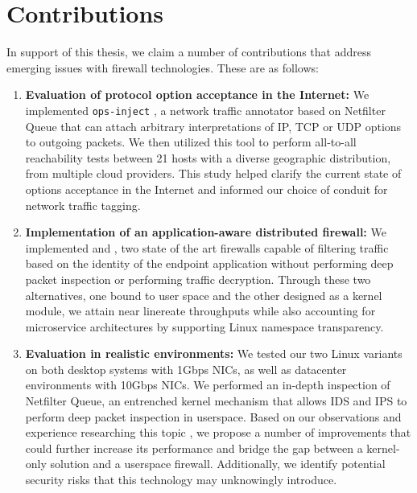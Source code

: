 \section{Contributions}
\label{conclusion:contrib}

In support of this thesis, we claim a number of contributions that address
emerging issues with firewall technologies. These are as follows:

\begin{enumerate}
    \item \textbf{Evaluation of protocol option acceptance in the Internet:}
    We implemented \texttt{ops-inject} \cite{mantu2024framework}, a network
    traffic annotator based on Netfilter Queue that can attach arbitrary
    interpretations of IP, TCP or UDP options to outgoing packets. We then
    utilized this tool to perform all-to-all reachability tests between 21
    hosts with a diverse geographic distribution, from multiple cloud providers.
    This study helped clarify the current state of options acceptance in the
    Internet and informed our choice of conduit for network traffic tagging.

    \item \textbf{Implementation of an application-aware distributed firewall:}
    We implemented \daf{} \cite{mantu2024process} and \scout{},
    two state of the art firewalls capable of filtering traffic based on the
    identity of the endpoint application without performing deep packet inspection
    or performing traffic decryption. Through these two alternatives, one
    bound to user space and the other designed as a kernel module, we attain near
    linereate throughputs while also accounting for microservice architectures
    by supporting Linux namespace transparency.

    \item \textbf{Evaluation in realistic environments:} We tested our two Linux
    variants on both desktop systems with 1Gbps NICs, as well as datacenter
    environments with 10Gbps NICs. We performed an in-depth inspection of Netfilter
    Queue, an entrenched kernel mechanism that allows IDS and IPS to perform
    deep packet inspection in userspace. Based on our observations and experience
    researching this topic \cite{gherghescu2024ve}, we propose a number of
    improvements that could further increase its performance and bridge the gap
    between a kernel-only solution and a userspace firewall. Additionally, we
    identify potential security risks that this technology may unknowingly introduce.


\end{enumerate}
